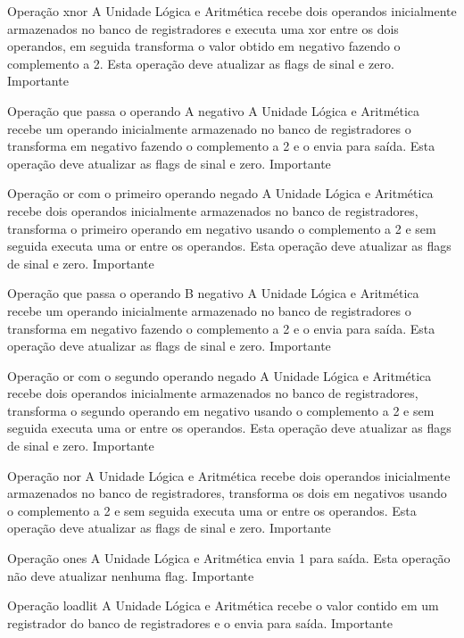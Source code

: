 \documentclass{report}
\begin{document}
\begin{functional}
       \requirement
      {Operação xnor}
      {A Unidade Lógica e Aritmética recebe dois operandos inicialmente armazenados no banco de registradores e executa uma xor entre os dois operandos, em seguida transforma o valor obtido em negativo fazendo o complemento a 2. Esta operação deve atualizar as flags de sinal e zero.}
      {Importante}
      
      \requirement
      {Operação que passa o operando A negativo}
      {A Unidade Lógica e Aritmética recebe um operando inicialmente armazenado no banco de registradores o transforma em negativo fazendo o complemento a 2 e o envia para saída. Esta operação deve atualizar as flags de sinal e zero.}
      {Importante}
      
       \requirement
      {Operação or com o primeiro operando negado}
      {A Unidade Lógica e Aritmética recebe dois operandos inicialmente armazenados no banco de registradores, transforma o primeiro operando em negativo usando o complemento a 2 e sem seguida executa uma or entre os  operandos. Esta operação deve atualizar as flags de sinal e zero.}
      {Importante}
      
       \requirement
      {Operação que passa o operando B negativo}
      {A Unidade Lógica e Aritmética recebe um operando inicialmente armazenado no banco de registradores o transforma em negativo fazendo o complemento a 2 e o envia para saída. Esta operação deve atualizar as flags de sinal e zero.}
      {Importante}
      
       \requirement
      {Operação or com o segundo operando negado}
      {A Unidade Lógica e Aritmética recebe dois operandos inicialmente armazenados no banco de registradores, transforma o segundo operando em negativo usando o complemento a 2 e sem seguida executa uma or entre os operandos. Esta operação deve atualizar as flags de sinal e zero.}
      {Importante}
      
      \requirement
      {Operação nor}
      {A Unidade Lógica e Aritmética recebe dois operandos inicialmente armazenados no banco de registradores, transforma os dois em negativos usando o complemento a 2 e sem seguida executa uma or entre os  operandos. Esta operação deve atualizar as flags de sinal e zero.}
      {Importante}
      
      \requirement
      {Operação ones}
      {A Unidade Lógica e Aritmética envia 1 para saída. Esta operação não deve atualizar nenhuma flag.}
      {Importante}
      
      \requirement
      {Operação loadlit}
      {A Unidade Lógica e Aritmética recebe o valor contido em um registrador do banco de registradores e o envia para saída.}
      {Importante}
      

\end{functional}
\end{document}
